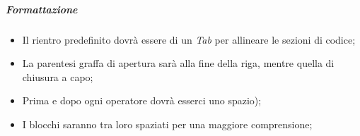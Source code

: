 \begin{comment}
	\begin{comment}
	\begin{itemize}
		\item \textcolor{red}{lista di linee guida per i commenti}
	\end{itemize}
	\end{comment}
	
	\subparagraph{Formattazione}
	\begin{itemize} 
		\item Il rientro predefinito dovrà essere di un \emph{Tab} per allineare le sezioni di codice;
		\item La parentesi graffa di apertura sarà alla fine della riga, mentre quella di chiusura a capo;
		\item Prima e dopo ogni operatore dovrà esserci uno spazio);
		\item I blocchi saranno tra loro spaziati per una maggiore comprensione;
	\end{itemize}
